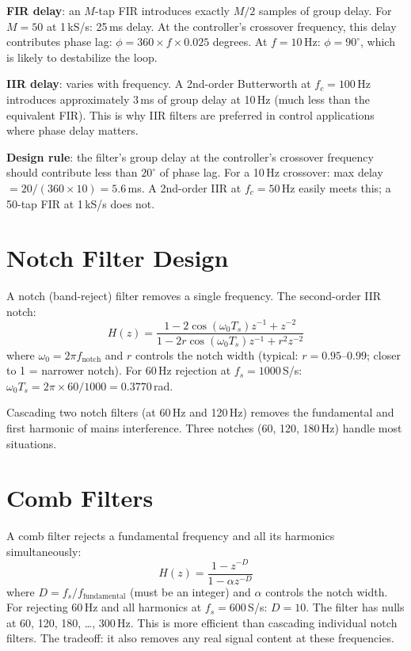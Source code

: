 \documentclass[11pt,letterpaper,twoside,openany]{book}
\begin{document}
\textbf{FIR delay}: an $M$-tap FIR introduces exactly $M/2$ samples of group delay. For $M = 50$ at 1\,kS/s: 25\,ms delay. At the controller's crossover frequency, this delay contributes phase lag: $\phi = 360 \times f \times 0.025$ degrees. At $f = 10$\,Hz: $\phi = 90^\circ$, which is likely to destabilize the loop.

\textbf{IIR delay}: varies with frequency. A 2nd-order Butterworth at $f_c = 100$\,Hz introduces approximately 3\,ms of group delay at 10\,Hz (much less than the equivalent FIR). This is why IIR filters are preferred in control applications where phase delay matters.

\textbf{Design rule}: the filter's group delay at the controller's crossover frequency should contribute less than $20^\circ$ of phase lag. For a 10\,Hz crossover: max delay $= 20/(360 \times 10) = 5.6$\,ms. A 2nd-order IIR at $f_c = 50$\,Hz easily meets this; a 50-tap FIR at 1\,kS/s does not.

\section{Notch Filter Design}
A notch (band-reject) filter removes a single frequency. The second-order IIR notch:
\begin{equation}
H(z) = \frac{1 - 2\cos(\omega_0 T_s)z^{-1} + z^{-2}}{1 - 2r\cos(\omega_0 T_s)z^{-1} + r^2 z^{-2}}
\end{equation}
where $\omega_0 = 2\pi f_{\text{notch}}$ and $r$ controls the notch width (typical: $r = 0.95$--$0.99$; closer to 1 = narrower notch). For 60\,Hz rejection at $f_s = 1000$\,S/s: $\omega_0 T_s = 2\pi \times 60/1000 = 0.3770$\,rad.

Cascading two notch filters (at 60\,Hz and 120\,Hz) removes the fundamental and first harmonic of mains interference. Three notches (60, 120, 180\,Hz) handle most situations.

\section{Comb Filters}
A comb filter rejects a fundamental frequency and all its harmonics simultaneously:
\begin{equation}
H(z) = \frac{1 - z^{-D}}{1 - \alpha z^{-D}}
\end{equation}
where $D = f_s/f_{\text{fundamental}}$ (must be an integer) and $\alpha$ controls the notch width. For rejecting 60\,Hz and all harmonics at $f_s = 600$\,S/s: $D = 10$. The filter has nulls at 60, 120, 180, \ldots, 300\,Hz. This is more efficient than cascading individual notch filters. The tradeoff: it also removes any real signal content at these frequencies.
\end{document}
